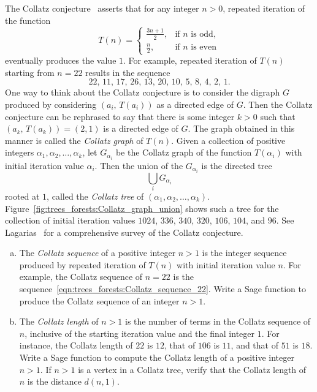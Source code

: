 \begin{problem}
\item The Collatz
  conjecture~\cite{Lagarias1985} asserts that for any integer $n > 0$,
  repeated iteration of the function
  \[
  T(n)
  =
  \begin{cases}
  \frac{3n + 1}{2}, & \text{if $n$ is odd}, \\[4pt]
  \frac{n}{2}, & \text{if $n$ is even}
  \end{cases}
  \]
  eventually produces the value $1$. For example, repeated iteration
  of $T(n)$ starting from $n = 22$ results in the sequence
  \begin{equation}
  \label{eqn:trees_forests:Collatz_sequence_22}
  22,\, 11,\, 17,\, 26,\, 13,\, 20,\, 10,\, 5,\, 8,\, 4,\, 2,\, 1.
  \end{equation}
  One way to think about the Collatz
  conjecture is to consider the digraph $G$ produced by considering
  $(a_i,\, T(a_i))$ as a directed edge of $G$. Then the Collatz
  conjecture can be rephrased to say that there is some integer
  $k > 0$ such that $(a_k,\, T(a_k)) = (2, 1)$ is a directed edge of
  $G$. The graph obtained in this manner is called the
  \emph{Collatz graph} of $T(n)$. Given a
  collection of positive integers
  $\alpha_1, \alpha_2, \dots, \alpha_k$, let $G_{\alpha_i}$ be the
  Collatz graph of the function $T(\alpha_i)$ with initial iteration
  value $\alpha_i$. Then the union of the $G_{\alpha_i}$ is the
  directed tree
  \[
  \bigcup_i G_{\alpha_i}
  \]
  rooted at $1$, called the \emph{Collatz tree} of
  $(\alpha_1, \alpha_2, \dots, \alpha_k)$.
  Figure~\ref{fig:trees_forests:Collatz_graph_union} shows such a tree
  for the collection of initial iteration values $1024$, $336$, $340$,
  $320$, $106$, $104$, and $96$. See
  Lagarias~\cite{Lagarias2009a,Lagarias2009b}
  for a comprehensive survey of the Collatz
  conjecture.
  \begin{enumerate}[(a)]
  \item The \emph{Collatz sequence} of a
    positive integer $n > 1$ is the integer sequence produced by
    repeated iteration of $T(n)$ with initial iteration value $n$. For
    example, the Collatz sequence of $n = 22$ is the
    sequence~\eqref{eqn:trees_forests:Collatz_sequence_22}. Write a
    Sage function to produce the Collatz sequence of an integer $n > 1$.

  \item The \emph{Collatz length} of $n > 1$ is
    the number of terms in the Collatz sequence of $n$, inclusive of
    the starting iteration value and the final integer $1$. For
    instance, the Collatz length of $22$ is $12$, that of $106$ is
    $11$, and that of $51$ is $18$. Write a Sage function to compute
    the Collatz length of a positive integer $n > 1$. If $n > 1$ is a
    vertex in a Collatz tree, verify that the Collatz length of $n$ is
    the distance $d(n,1)$.


\end{enumerate}
\end{problem}
